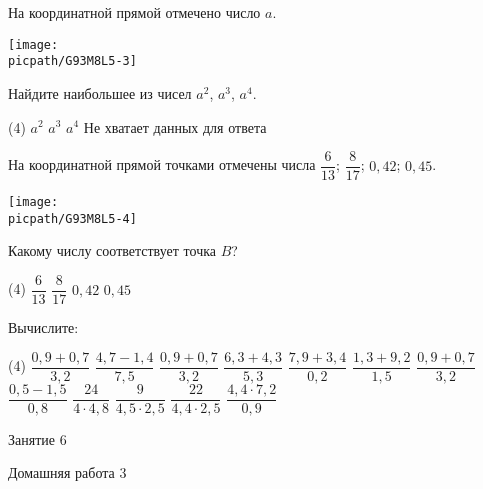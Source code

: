 \begin{class}[number=5]
\begin{listofex}
\begin{tasks}
		\end{tasks}
		\item На координатной прямой отмечено число \( a \).
		\begin{center}
			\texttt{[image: \\picpath/G93M8L5-3]}
		\end{center}
		Найдите наибольшее из чисел \( a^2 \), \( a^3 \), \( a^4 \).
		\begin{tasks}(4)
			\task \( a^2 \)
			\task \( a^3 \)
			\task \( a^4 \)
			\task Не хватает данных для ответа
		\end{tasks}
		\item На координатной прямой точками отмечены числа \( \dfrac{6}{13} \); \( \dfrac{8}{17} \); \( 0,42 \); \( 0,45 \).
		\begin{center}
			\texttt{[image: \\picpath/G93M8L5-4]}
		\end{center}
		Какому числу соответствует точка \( B \)?
		\begin{tasks}(4)
			\task \( \dfrac{6}{13} \)
			\task \( \dfrac{8}{17} \)
			\task \( 0,42 \)
			\task \( 0,45 \)
		\end{tasks}
		\item Вычислите:
		\begin{tasks}(4)
			\task \( \dfrac{0,9+0,7}{3,2} \)
			\task \( \dfrac{4,7-1,4}{7,5} \)
			\task \( \dfrac{0,9+0,7}{3,2} \)
			\task \( \dfrac{6,3+4,3}{5,3} \)
			\task \( \dfrac{7,9+3,4}{0,2} \)
			\task \( \dfrac{1,3+9,2}{1,5} \)
			\task \( \dfrac{0,9+0,7}{3,2} \)
			\task \( \dfrac{0,5-1,5}{0,8} \)
			\task \( \dfrac{24}{4\cdot4,8} \)
			\task \( \dfrac{9}{4,5\cdot2,5} \)
			\task \( \dfrac{22}{4,4\cdot2,5} \)
			\task \( \dfrac{4,4\cdot7,2}{0,9} \)
		\end{tasks}
	\end{listofex}
\end{class}

\begin{class}[number=6]
	\begin{listofex}
		\item Занятие 6
	\end{listofex}
\end{class}

\begin{homework}[number=3]
	\begin{listofex}
		\item Домашняя работа 3
	\end{listofex}
\end{homework}

